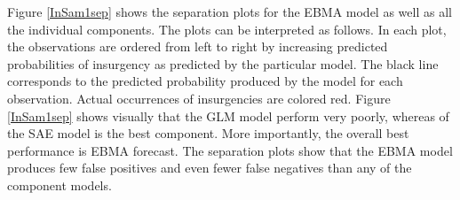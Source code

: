 \documentclass[pdftex,12pt,fullpage,oneside]{amsart}
\begin{document}

Figure \ref{InSam1sep} shows the separation plots for the EBMA model
as well as all the individual components. The plots can be interpreted
as follows. In each plot, the observations are ordered from left to
right by increasing predicted probabilities of insurgency as predicted
by the particular model. The black line corresponds to the predicted
probability produced by the model for each observation. Actual
occurrences of insurgencies are colored red.  Figure \ref{InSam1sep}
shows visually that the GLM model perform very poorly, whereas of the
SAE model is the best component.  More importantly, the overall best
performance is EBMA forecast. The separation plots show that the EBMA
model produces few false positives and even fewer false negatives than
any of the component models.
\end{document}
